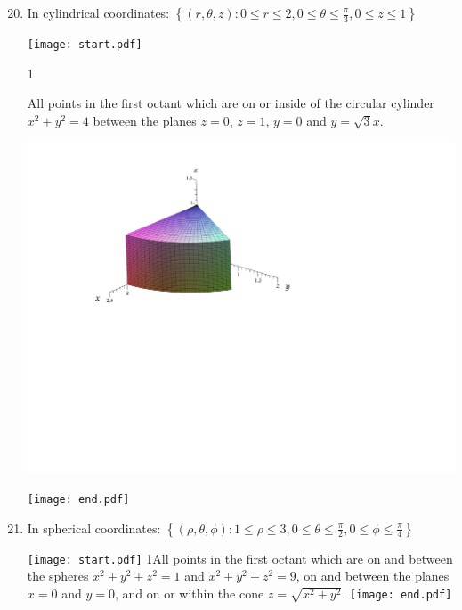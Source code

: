 \documentclass[12pt]{article}
\begin{document}
\begin{enumerate}
\setcounter{enumi}{19}

\item In cylindrical coordinates: $\left\{(r,\theta,z): 0 \leq r \leq 2, 0 \leq \theta \leq \frac{\pi}{3}, 0 \leq z \leq 1\right\}$

\texttt{[image: start.pdf]}
{{{1\linewidth}{All points in the first octant which are on or inside of the circular cylinder $x^2+y^2=4$ between the planes $z=0$, $z=1$, $y=0$ and $y=\sqrt{3}x$.
\begin{center}
\includegraphics[scale=0.4]{describe1.pdf}
\end{center}}}}
\texttt{[image: end.pdf]}


\item In spherical coordinates: $\left\{(\rho,\theta,\phi): 1 \leq \rho \leq 3, 0 \leq \theta \leq \frac{\pi}{2}, 0 \leq \phi \leq \frac{\pi}{4}\right\}$

\texttt{[image: start.pdf]}
{{{1\linewidth}{All points in the first octant which are on and between the spheres $x^2+y^2+z^2=1$ and $x^2+y^2+z^2=9$, on and between the planes $x=0$ and $y=0$, and on or within the cone $z=\sqrt{x^2+y^2}$.}}}
\texttt{[image: end.pdf]}


\end{enumerate}
\end{document}
